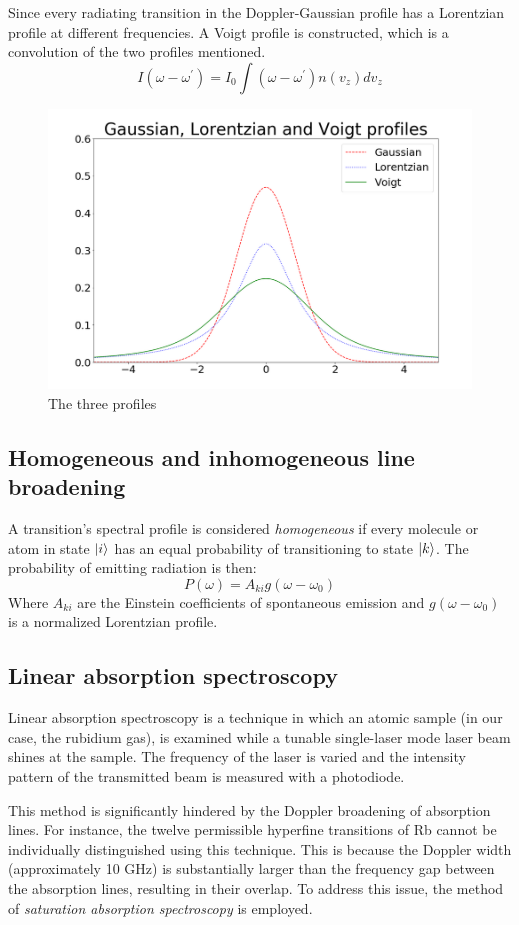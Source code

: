 \documentclass{article}
\DeclarePairedDelimiter\ket{\lvert}{\rangle}
\begin{document}
Since every radiating transition in the Doppler-Gaussian profile has a Lorentzian profile at different frequencies. A Voigt profile is constructed, which is a convolution of the two profiles mentioned. 
\begin{equation}    
    I\left(\omega-\omega^{\prime}\right)=I_0 \int\left(\omega-\omega^{\prime}\right) n\left(v_z\right) d v_z
\end{equation}

\begin{figure}[h]
    \centering \includegraphics[width=0.5\linewidth]{Figures/1.png}
    \caption{The three profiles}
    \label{fig:enter-label}
\end{figure}
\pagebreak{}
\subsection{Homogeneous and inhomogeneous line broadening}

A transition's spectral profile is considered \textit{homogeneous} if every molecule or atom in state $\ket{i}$ has an equal probability of transitioning to state $\ket{k}$. The probability of emitting radiation is then: 
\begin{equation}
   P(\omega) = A_{ki}g(\omega-\omega_0) 
\end{equation}
Where $A_{ki}$ are the Einstein coefficients of spontaneous emission and $g(\omega-\omega_0)$ is a normalized Lorentzian profile. 

\subsection{Linear absorption spectroscopy} 
Linear absorption spectroscopy is a technique in which an atomic sample (in our case, the rubidium gas), is examined while a tunable single-laser mode laser beam shines at the sample. The frequency of the laser is varied and the intensity pattern of the transmitted beam is measured with a photodiode. 

This method is significantly hindered by the Doppler broadening of absorption lines. For instance, the twelve permissible hyperfine transitions of Rb cannot be individually distinguished using this technique. This is because the Doppler width (approximately 10 GHz) is substantially larger than the frequency gap between the absorption lines, resulting in their overlap. To address this issue, the method of \textit{saturation absorption spectroscopy} is employed.
\end{document}
